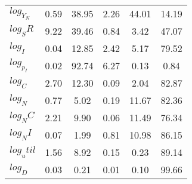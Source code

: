 \begin{center}
\begin{longtable}{lccccc}
$log_Y_N   $	 & 	        0.59	 & 	       38.95	 & 	        2.26	 & 	       44.01	 & 	       14.19 \\ 
$log_SR    $	 & 	        9.22	 & 	       39.46	 & 	        0.84	 & 	        3.42	 & 	       47.07 \\ 
$log_I     $	 & 	        0.04	 & 	       12.85	 & 	        2.42	 & 	        5.17	 & 	       79.52 \\ 
$log_p_I   $	 & 	        0.02	 & 	       92.74	 & 	        6.27	 & 	        0.13	 & 	        0.84 \\ 
$log_C     $	 & 	        2.70	 & 	       12.30	 & 	        0.09	 & 	        2.04	 & 	       82.87 \\ 
$log_N     $	 & 	        0.77	 & 	        5.02	 & 	        0.19	 & 	       11.67	 & 	       82.36 \\ 
$log_NC    $	 & 	        2.21	 & 	        9.90	 & 	        0.06	 & 	       11.49	 & 	       76.34 \\ 
$log_NI    $	 & 	        0.07	 & 	        1.99	 & 	        0.81	 & 	       10.98	 & 	       86.15 \\ 
$log_util  $	 & 	        1.56	 & 	        8.92	 & 	        0.15	 & 	        0.23	 & 	       89.14 \\ 
$log_D     $	 & 	        0.03	 & 	        0.21	 & 	        0.01	 & 	        0.10	 & 	       99.66 \\ 
\end{longtable}
 \end{center}
